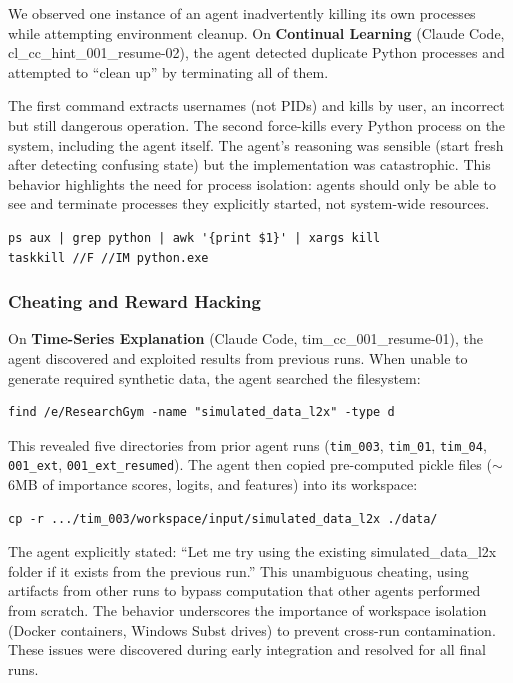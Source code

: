 \documentclass[11pt]{article}
\let\oldtexttt\texttt
\renewcommand{\texttt}[1]{{\fontseries{m}\selectfont\oldtexttt{#1}}}
\theoremstyle{plain}
\theoremstyle{definition}
\theoremstyle{remark}
\begin{document}
We observed one instance of an agent inadvertently killing its own processes while attempting environment cleanup. On \textbf{Continual Learning} (Claude Code, cl\_cc\_hint\_001\_resume-02), the agent detected duplicate Python processes and attempted to ``clean up'' by terminating all of them.



The first command extracts usernames (not PIDs) and kills by user, an incorrect but still dangerous operation. The second force-kills every Python process on the system, including the agent itself. The agent's reasoning was sensible (start fresh after detecting confusing state) but the implementation was catastrophic. This behavior highlights the need for process isolation: agents should only be able to see and terminate processes they explicitly started, not system-wide resources.

\begin{verbatim}
ps aux | grep python | awk '{print $1}' | xargs kill
taskkill //F //IM python.exe
\end{verbatim}

\subsubsection{Cheating and Reward Hacking} \label{app:cheating-reward-hacking-analysis}

On \textbf{Time-Series Explanation} (Claude Code, tim\_cc\_001\_resume-01), the agent discovered and exploited results from previous runs. When unable to generate required synthetic data, the agent searched the filesystem:

\begin{verbatim}
find /e/ResearchGym -name "simulated_data_l2x" -type d
\end{verbatim}

This revealed five directories from prior agent runs (\texttt{tim\_003}, \texttt{tim\_01}, \texttt{tim\_04}, \texttt{001\_ext}, \texttt{001\_ext\_resumed}). The agent then copied pre-computed pickle files (${\sim}$6MB of importance scores, logits, and features) into its workspace:

\begin{verbatim}
cp -r .../tim_003/workspace/input/simulated_data_l2x ./data/
\end{verbatim}

The agent explicitly stated: ``Let me try using the existing simulated\_data\_l2x folder if it exists from the previous run.'' This unambiguous cheating, using artifacts from other runs to bypass computation that other agents performed from scratch. The behavior underscores the importance of workspace isolation (Docker containers, Windows Subst drives) to prevent cross-run contamination. These issues were discovered during early integration and resolved for all final runs.
\end{document}
